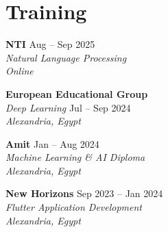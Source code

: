\section{Training}
\resumeSubHeadingListStart

    \item
    \begin{minipage}[t]{\linewidth}
      \textbf{NTI} \hfill {\footnotesize Aug -- Sep 2025} \\
      \textit{\footnotesize Natural Language Processing} \\
      \textit{\scriptsize Online}
    \end{minipage}\vspace{-2pt}

    \item
    \begin{minipage}[t]{\linewidth}
      \textbf{European Educational Group} \\
      \textit{\footnotesize Deep Learning} \hfill {\footnotesize Jul -- Sep 2024} \\
      \textit{\scriptsize Alexandria, Egypt}
    \end{minipage}\vspace{-2pt}

    \item
    \begin{minipage}[t]{\linewidth}
      \textbf{Amit} \hfill {\footnotesize Jan -- Aug 2024} \\
      \textit{\footnotesize Machine Learning \& AI Diploma} \\
      \textit{\scriptsize Alexandria, Egypt}
    \end{minipage}\vspace{-2pt}

    \item
    \begin{minipage}[t]{\linewidth}
      \textbf{New Horizons} \hfill {\footnotesize Sep 2023 -- Jan 2024} \\
      \textit{\footnotesize Flutter Application Development} \\
      \textit{\scriptsize Alexandria, Egypt}
    \end{minipage}\vspace{-4pt}

\resumeSubHeadingListEnd